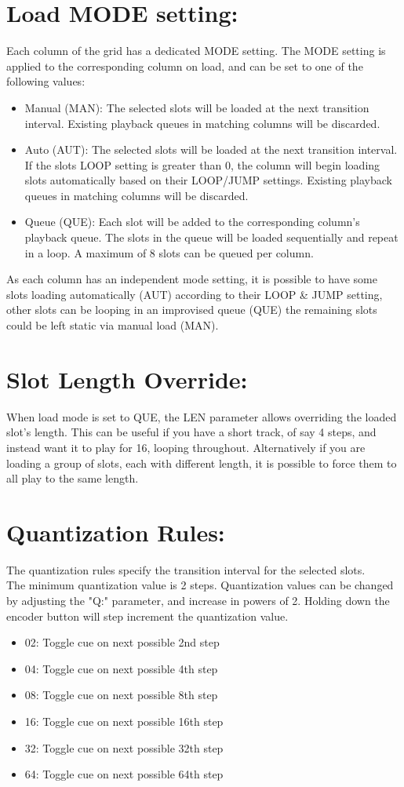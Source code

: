 \section{Load MODE setting:}
Each column of the grid has a dedicated MODE setting. The MODE setting is applied to the corresponding column on load, and can be set to one of the following values:

\begin{itemize}
    \item Manual (MAN):  The selected slots will be loaded at the next transition interval. Existing playback queues in matching columns will be discarded.
    \item Auto (AUT): The selected slots will be loaded at the next transition interval. If the slots LOOP setting is greater than 0, the column will begin loading slots automatically based on their LOOP/JUMP settings. Existing playback queues in matching columns will be discarded.
    \item Queue (QUE): Each slot will be added to the corresponding column's playback queue. The slots in the queue will be loaded sequentially and repeat in a loop. A maximum of 8 slots can be queued per column. 
\end{itemize}

As each column has an independent mode setting, it is possible to have some slots loading automatically (AUT) according to their LOOP \& JUMP setting, other slots can be looping in an improvised queue (QUE) the remaining slots could be left static via manual load (MAN).
\newpage
\section{Slot Length Override:}
When load mode is set to QUE, the LEN parameter allows overriding the loaded slot's length. This can be useful if you have a short track, of say 4 steps, and instead want it to play for 16, looping throughout. Alternatively if you are loading a group of slots, each with different length, it is possible to force them to all play to the same length.

\section{Quantization Rules:}
The quantization rules specify the transition interval for the selected slots.\\
The minimum quantization value is 2 steps. Quantization values can be changed by adjusting the "Q:" parameter, and increase in powers of 2. Holding down the encoder button will step increment the quantization value.
\begin{itemize}
\item 02: Toggle cue on next possible 2nd step
\item 04: Toggle cue on next possible 4th step
\item 08: Toggle cue on next possible 8th step 
\item 16: Toggle cue on next possible 16th step 
\item 32: Toggle cue on next possible 32th step 
\item 64: Toggle cue on next possible 64th step
\end{itemize}

